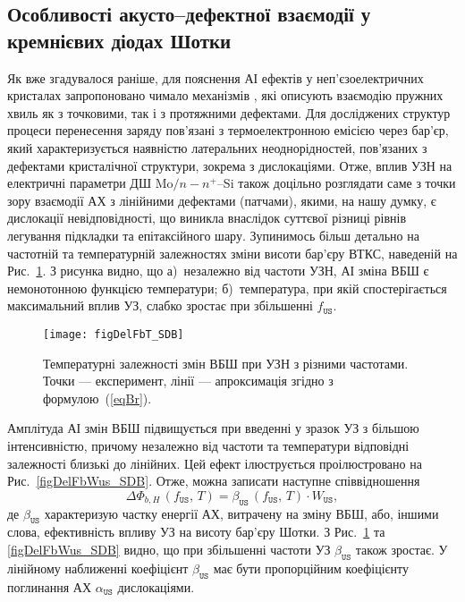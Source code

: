 \documentclass[a4paper,14pt,oneside,openany]{memoir}
\begin{document}
\subsection{Особливості акусто--дефектної взаємодії у кремнієвих діодах Шотки}

Як вже згадувалося раніше, для пояснення АІ ефектів у неп'єзоелектричних кристалах
запропоновано чимало механізмів \cite{Pavlovich,Korotchenkov1995,MirzadeJAP2011,PELESHCHAK:UPJ2016,Krevchik,MirzadeJAP2005,Davletova2008,OstrovKor92},
які описують взаємодію пружних хвиль як з точковими, так і з протяжними дефектами.
Для досліджених структур процеси перенесення заряду пов'язані з термоелектронною емісією
через бар'єр, який характеризується наявністю латеральних неоднорідностей, пов'язаних з дефектами
кристалічної структури, зокрема з дислокаціями.
Отже, вплив УЗН на електричні параметри ДШ Mo$/n-n^+$--Si також доцільно розглядати саме з точки зору
взаємодії АХ з лінійними дефектами (патчами), якими, на нашу думку, є дислокації невідповідності, що
виникла внаслідок суттєвої різниці рівнів легування підкладки та епітаксійного шару.
Зупинимось більш детально на частотній та температурній залежностях зміни висоти бар'єру ВТКС,
наведеній на Рис.~\ref{figDelFbT_SDB}.
З рисунка видно, що
а)~незалежно від частоти УЗН, АІ зміна ВБШ є немонотонною функцією температури;
б)~температура, при якій спостерігається максимальний вплив УЗ, слабко зростає при збільшенні $f_\mathtt{US}$.

\begin{figure}
\center
\texttt{[image: figDelFbT\_SDB]}
\caption{\label{figDelFbT_SDB}
Температурні залежності змін ВБШ при УЗН з різними частотами.
Точки --- експеримент,
лінії --- апроксимація згідно з формулою~(\ref{eqBr}).
}%
\end{figure}

Амплітуда АІ змін ВБШ підвищується при введенні у зразок УЗ з більшою інтенсивністю, причому незалежно від частоти та температури
відповідні залежності близькі до лінійних.
Цей ефект ілюструється проілюстровано на Рис.~\ref{figDelFbWus_SDB}.
Отже, можна записати наступне співвідношення
\begin{equation}
\label{eqBt}
\Delta\Phi_{b,H}\,(f_\mathtt{US},\,T)=\beta_\mathtt{US}\,(f_\mathtt{US},\,T)\cdot W_\mathtt{US},
\end{equation}
де
$\beta_\mathtt{US}$ характеризую частку енергії АХ, витрачену на зміну ВБШ, або, іншими слова,
ефективність впливу УЗ на висоту бар'єру Шотки.
З Рис.~\ref{figDelFbT_SDB} та \ref{figDelFbWus_SDB} видно, що при збільшенні частоти УЗ $\beta_\mathtt{US}$ також зростає.
У лінійному наближенні коефіцієнт $\beta_\mathtt{US}$ має бути пропорційним коефіцієнту поглинання АХ $\alpha_\mathtt{US}$ дислокаціями.
\end{document}
